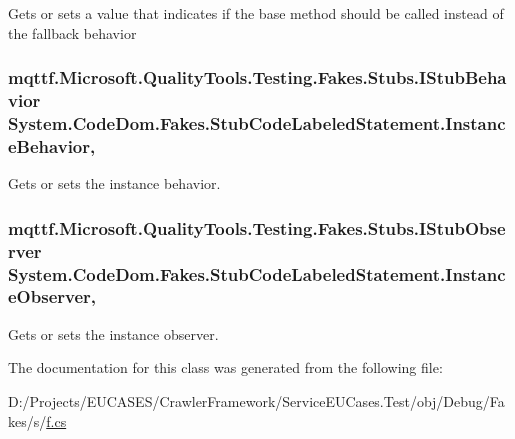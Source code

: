 Gets or sets a value that indicates if the base method should be called instead of the fallback behavior

\hypertarget{class_system_1_1_code_dom_1_1_fakes_1_1_stub_code_labeled_statement_ad86d87b18eff0e0de4b022936bfe6449}{
\subsubsection[{Instance\-Behavior}]{\setlength{\rightskip}{0pt plus 5cm}mqttf.\-Microsoft.\-Quality\-Tools.\-Testing.\-Fakes.\-Stubs.\-I\-Stub\-Behavior System.\-Code\-Dom.\-Fakes.\-Stub\-Code\-Labeled\-Statement.\-Instance\-Behavior\hspace{0.3cm}{\ttfamily [get]}, {\ttfamily [set]}}}\label{class_system_1_1_code_dom_1_1_fakes_1_1_stub_code_labeled_statement_ad86d87b18eff0e0de4b022936bfe6449}


Gets or sets the instance behavior.

\hypertarget{class_system_1_1_code_dom_1_1_fakes_1_1_stub_code_labeled_statement_ae26a8fbb1dfe39f0d1d5567f56cf6a16}{
\subsubsection[{Instance\-Observer}]{\setlength{\rightskip}{0pt plus 5cm}mqttf.\-Microsoft.\-Quality\-Tools.\-Testing.\-Fakes.\-Stubs.\-I\-Stub\-Observer System.\-Code\-Dom.\-Fakes.\-Stub\-Code\-Labeled\-Statement.\-Instance\-Observer\hspace{0.3cm}{\ttfamily [get]}, {\ttfamily [set]}}}\label{class_system_1_1_code_dom_1_1_fakes_1_1_stub_code_labeled_statement_ae26a8fbb1dfe39f0d1d5567f56cf6a16}


Gets or sets the instance observer.



The documentation for this class was generated from the following file\-:\begin{DoxyCompactItemize}
\item 
D\-:/\-Projects/\-E\-U\-C\-A\-S\-E\-S/\-Crawler\-Framework/\-Service\-E\-U\-Cases.\-Test/obj/\-Debug/\-Fakes/s/\hyperlink{s_2f_8cs}{f.\-cs}\end{DoxyCompactItemize}
